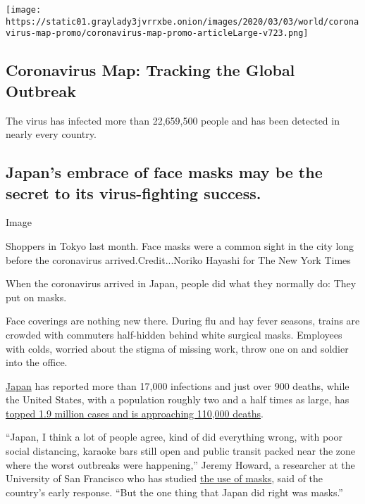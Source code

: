 \href{https://www.nytimes3xbfgragh.onion/interactive/2020/world/coronavirus-maps.html}{}

\texttt{[image: https://static01.graylady3jvrrxbe.onion/images/2020/03/03/world/coronavirus-map-promo/coronavirus-map-promo-articleLarge-v723.png]}

\hypertarget{coronavirus-map-tracking-the-global-outbreak}{%
\subsection{Coronavirus Map: Tracking the Global
Outbreak}\label{coronavirus-map-tracking-the-global-outbreak}}

The virus has infected more than 22,659,500 people and has been detected
in nearly every country.

\hypertarget{japans-embrace-of-face-masks-may-be-the-secret-to-its-virus-fighting-success}{%
\subsection{Japan's embrace of face masks may be the secret to its
virus-fighting
success.}\label{japans-embrace-of-face-masks-may-be-the-secret-to-its-virus-fighting-success}}

Image

Shoppers in Tokyo last month. Face masks were a common sight in the city
long before the coronavirus arrived.Credit...Noriko Hayashi for The New
York Times

When the coronavirus arrived in Japan, people did what they normally do:
They put on masks.

Face coverings are nothing new there. During flu and hay fever seasons,
trains are crowded with commuters half-hidden behind white surgical
masks. Employees with colds, worried about the stigma of missing work,
throw one on and soldier into the office.

\href{https://www.nytimes3xbfgragh.onion/interactive/2020/world/coronavirus-maps.html\#countries}{Japan}
has reported more than 17,000 infections and just over 900 deaths, while
the United States, with a population roughly two and a half times as
large, has
\href{https://www.nytimes3xbfgragh.onion/interactive/2020/us/coronavirus-us-cases.html}{topped
1.9 million cases and is approaching 110,000 deaths}.

``Japan, I think a lot of people agree, kind of did everything wrong,
with poor social distancing, karaoke bars still open and public transit
packed near the zone where the worst outbreaks were happening,'' Jeremy
Howard, a researcher at the University of San Francisco who has studied
\href{https://www.preprints.org/manuscript/202004.0203/v2}{the use of
masks}, said of the country's early response. ``But the one thing that
Japan did right was masks.''


